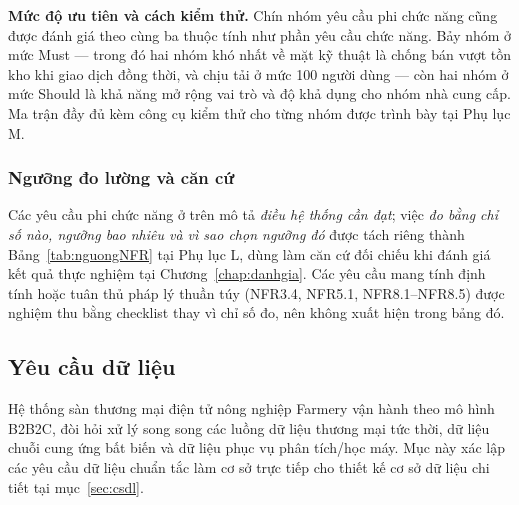\noindent\textbf{Mức độ ưu tiên và cách kiểm thử.} Chín nhóm yêu cầu phi chức năng cũng được đánh giá theo cùng ba thuộc tính như phần yêu cầu chức năng. Bảy nhóm ở mức Must --- trong đó hai nhóm khó nhất về mặt kỹ thuật là chống bán vượt tồn kho khi giao dịch đồng thời, và chịu tải ở mức 100 người dùng --- còn hai nhóm ở mức Should là khả năng mở rộng vai trò và độ khả dụng cho nhóm nhà cung cấp. Ma trận đầy đủ kèm công cụ kiểm thử cho từng nhóm được trình bày tại Phụ lục M.

\subsubsection*{Ngưỡng đo lường và căn cứ}
\label{subsec:nguongNFR}

Các yêu cầu phi chức năng ở trên mô tả \textit{điều hệ thống cần đạt}; việc
\textit{đo bằng chỉ số nào, ngưỡng bao nhiêu và vì sao chọn ngưỡng đó} được
tách riêng thành Bảng~\ref{tab:nguongNFR} tại Phụ lục L, dùng làm căn cứ đối
chiếu khi đánh giá kết quả thực nghiệm tại Chương~\ref{chap:danhgia}. Các yêu
cầu mang tính định tính hoặc tuân thủ pháp lý thuần túy (NFR3.4, NFR5.1,
NFR8.1--NFR8.5) được nghiệm thu bằng checklist thay vì chỉ số đo, nên
không xuất hiện trong bảng đó.


\subsection{Yêu cầu dữ liệu}
\label{subsec:yeucaudulieu}

Hệ thống sàn thương mại điện tử nông nghiệp Farmery vận hành theo mô hình B2B2C, đòi hỏi xử lý song song các luồng dữ liệu thương mại tức thời, dữ liệu chuỗi cung ứng bất biến và dữ liệu phục vụ phân tích/học máy. Mục này xác lập các yêu cầu dữ liệu chuẩn tắc làm cơ sở trực tiếp cho thiết kế cơ sở dữ liệu chi tiết tại mục~\ref{sec:csdl}.

